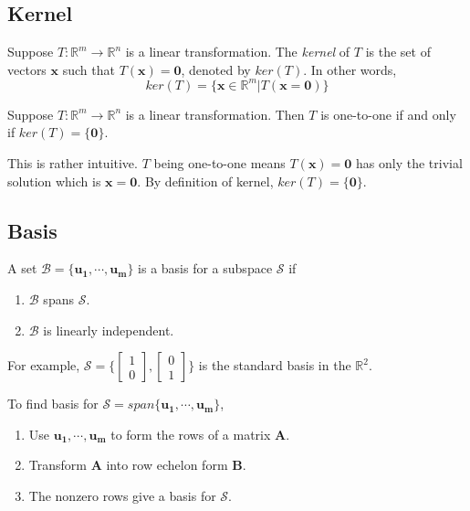 \subsection{Kernel}
\begin{definition}[Kernel]
Suppose $T:\mathbb{R}^m\rightarrow\mathbb{R}^n$ is a linear transformation. The \emph{kernel} of $T$ is the set of vectors $\bm{x}$ such that $T(\bm{x})=\bm{0}$, denoted by $ker(T)$. In other words,
\begin{equation}
ker(T) = \{\bm{x}\in\mathbb{R}^m | T(\bm{x}=\bm{0})\}
\end{equation}
\end{definition}

\begin{theorem}
Suppose $T:\mathbb{R}^m\rightarrow\mathbb{R}^n$ is a linear transformation. Then $T$ is one-to-one if and only if $ker(T)=\{\bm{0}\}$.
\end{theorem}
This is rather intuitive. $T$ being one-to-one means $T(\bm{x})=\bm{0}$ has only the trivial solution which is $\bm{x}=\bm{0}$. By definition of kernel, $ker(T)=\{\bm{0}\}$.

\subsection{Basis}
\begin{definition}[Basis]
A set $\mathcal{B}=\{\bm{u_1},\cdots,\bm{u_m}\}$ is a basis for a subspace $\mathcal{S}$ if
\begin{enumerate}[label=\alph*)]
    \item $\mathcal{B}$ spans $\mathcal{S}$.
    \item $\mathcal{B}$ is linearly independent.
\end{enumerate}
\end{definition}
\noindent For example, $\mathcal{S}=\Big\{\begin{bmatrix}1\\0\end{bmatrix},\begin{bmatrix}0\\1\end{bmatrix}\Big\}$ is the standard basis in the $\mathbb{R}^2$.

\noindent To find basis for $\mathcal{S}=span\{\bm{u_1},\cdots,\bm{u_m}\}$,
\begin{enumerate}
    \item Use $\bm{u_1},\cdots,\bm{u_m}$ to form the rows of a matrix $\bm{A}$.
    \item Transform $\bm{A}$ into row echelon form $\bm{B}$.
    \item The nonzero rows give a basis for $\mathcal{S}$.
\end{enumerate}

